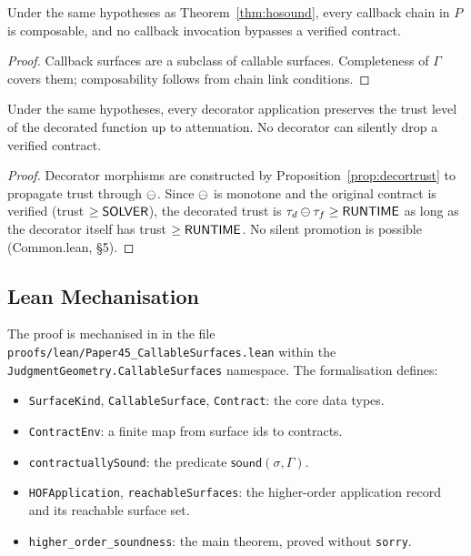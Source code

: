 \documentclass[11pt]{article}
\newcommand{\surf}{\sigma}                     %
\newcommand{\CEnv}{\Gamma}                     %
\newcommand{\sound}{\mathsf{sound}}            %
\begin{document}
\begin{corollary}\label{cor:cbescape}
Under the same hypotheses as Theorem~\ref{thm:hosound}, every
callback chain in $P$ is composable, and no callback invocation
bypasses a verified contract.
\end{corollary}

\begin{proof}
Callback surfaces are a subclass of callable surfaces.  Completeness
of $\CEnv$ covers them; composability follows from chain link
conditions.
\end{proof}

\begin{corollary}\label{cor:decsafety}
Under the same hypotheses, every decorator application preserves the
trust level of the decorated function up to attenuation.  No decorator
can silently drop a verified contract.
\end{corollary}

\begin{proof}
Decorator morphisms are constructed by Proposition~\ref{prop:decortrust}
to propagate trust through $\ominus$.  Since $\ominus$ is monotone and
the original contract is verified (trust $\ge \mathsf{SOLVER}$), the
decorated trust is $\tau_d \ominus \tau_f \ge \mathsf{RUNTIME}$ as long as
the decorator itself has trust $\ge \mathsf{RUNTIME}$.  No silent promotion
is possible (Common.lean, \S5).
\end{proof}

\subsection{Lean Mechanisation}

The proof is mechanised in \LEAN{} in the file
\texttt{proofs/lean/Paper45\_CallableSurfaces.lean} within the
\texttt{JudgmentGeometry.CallableSurfaces} namespace.  The
formalisation defines:
\begin{itemize}
  \item \texttt{SurfaceKind}, \texttt{CallableSurface},
        \texttt{Contract}: the core data types.
  \item \texttt{ContractEnv}: a finite map from surface ids to
        contracts.
  \item \texttt{contractuallySound}: the predicate
        $\sound(\surf, \CEnv)$.
  \item \texttt{HOFApplication}, \texttt{reachableSurfaces}: the
        higher-order application record and its reachable surface set.
  \item \texttt{higher\_order\_soundness}: the main theorem,
        proved without \texttt{sorry}.
\end{itemize}
\end{document}
